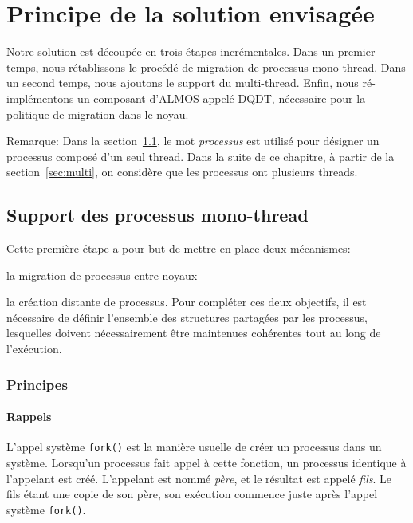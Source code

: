 \chapter{Principe de la solution envisagée}
\label{chap:sol}

  Notre solution est découpée en trois étapes incrémentales. Dans un premier
  temps, nous rétablissons le procédé de migration de processus
  mono-thread. Dans un second temps, nous ajoutons le support du
  multi-thread. Enfin, nous ré-implémentons un composant d'ALMOS appelé
  DQDT, nécessaire pour la politique de migration dans le noyau.

  \begin{paragraph}{Remarque:}
    Dans la section~\ref{sec:mono}, le mot \textit{processus} est utilisé pour
    désigner un processus composé d'un seul thread. Dans la suite de ce
    chapitre, à partir de la section~\ref{sec:multi}, on considère que les
    processus ont plusieurs threads.
  \end{paragraph}


  \section{Support des processus mono-thread}
  \label{sec:mono}

    Cette première étape a pour but de mettre en place deux mécanismes:
    \benumline \item la migration de processus entre noyaux \item la création
    distante de processus\eenumline. Pour compléter ces deux objectifs, il est
    nécessaire de définir l'ensemble des structures partagées par les processus,
    lesquelles doivent nécessairement être maintenues cohérentes tout au long de
    l'exécution.

    \subsection{Principes}

      \subsubsection{Rappels}

        L'appel système \texttt{fork()} est la manière usuelle de créer un
        processus dans un système. Lorsqu'un processus fait appel à cette
        fonction, un processus identique à l'appelant est créé. L'appelant est
        nommé \textit{père}, et le résultat est appelé \textit{fils}. Le fils
        étant une copie de son père, son exécution commence juste après l'appel
        système \texttt{fork()}.

